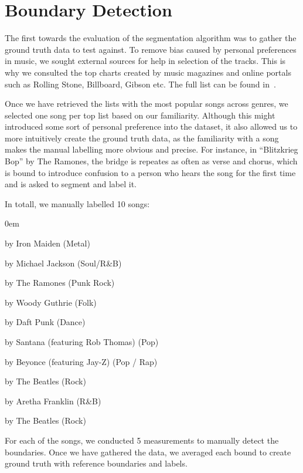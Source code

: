 \section{Boundary Detection}

The first towards the evaluation of the segmentation algorithm was to gather the ground truth data to test against. To remove bias caused by personal preferences in music, we sought external sources for help in selection of the tracks. This is why we consulted the top charts created by music magazines and online portals such as Rolling Stone, Billboard, Gibson etc. The full list can be found in~\cite{toplists}.

Once we have retrieved the lists with the most popular songs across genres, we selected one song per top list based on our familiarity. Although this might introduced some sort of personal preference into the dataset, it also allowed us to more intuitively create the ground truth data, as the familiarity with a song makes the manual labelling more obvious and precise. For instance, in ``Blitzkrieg Bop'' by The Ramones, the bridge is repeates as often as verse and chorus, which is bound to introduce confusion to a person who hears the song for the first time and is asked to segment and label it.

In totall, we manually labelled 10 songs:
\vspace{-10pt}
\begin{description}
\itemsep0em 
\item[``The Number of The Beast''] by Iron Maiden (Metal)
\item[``Rock With You''] by Michael Jackson (Soul/R\&B)
\item[``Blitzkrieg Bop''] by The Ramones (Punk Rock)
\item[``This Land is Your Land''] by Woody Guthrie (Folk)
\item[``One More Time''] by Daft Punk (Dance)
\item[``Smooth''] by Santana (featuring Rob Thomas) (Pop)
\item[``Crazy in Love''] by Beyonce (featuring Jay-Z) (Pop / Rap)
\item[``Help!''] by The Beatles (Rock)
\item[``Respect''] by Aretha Franklin (R\&B)
\item[``Back in the USSR''] by The Beatles (Rock)
\end{description}

For each of the songs, we conducted 5 measurements to manually detect the boundaries. Once we have gathered the data, we averaged each bound to create ground truth with reference boundaries and labels.



